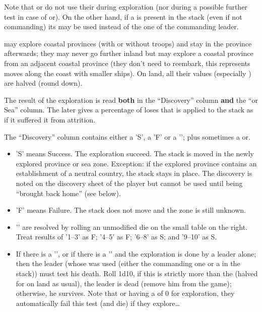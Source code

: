 \newcommand{\myxxa}{\phantom{a}\xxa\xspace}
\newcommand{\myxxc}{\phantom{a}\xxc\xspace}

Note that \LeaderG or \LeaderA do not use their \Man during exploration (nor
during a possible further test in case of\myxxa or\myxxc). On the
other hand, if a \LeaderMis is present in the stack (even if not commanding)
its \Man may be used instead of the one of the commanding leader.

\LeaderE may explore coastal provinces (with or without troops) and stay in
the province afterwards; they may never go further inland but may explore a
coastal province from an adjacent coastal province (they don't need to
reembark, this represents moves along the coast with smaller ships). On land,
all their values (especially \Man) are halved (round down).

The result of the exploration is read \textbf{both} in the ``Discovery''
column \textbf{and} the ``\ROTW or Sea'' column. The later gives a percentage
of loses that is applied to the stack as if it suffered it from
attrition.

The ``Discovery'' column contains either a 'S', a 'F' or a '\undemi'; plus
sometimes a\myxxa or\myxxc.
\begin{itemize}
\item 'S' means Success. The exploration succeed. The stack is moved in the
  newly explored province or sea zone. Exception: if the explored province
  contains an establishment of a neutral country, the stack stays in
  place. The discovery is noted on the discovery sheet of the player but
  cannot be used until being ``brought back home'' (see below).
\item 'F' means Failure. The stack does not move and the zone is still
  unknown.
\item '\undemi' are resolved by rolling an unmodified die on the small table
  on the right. Treat results of '1--3' as F\xxa; '4--5' as F\xxc; '6--8'
  as S\xxa; and '9--10' as S\xxc.
\item If there is a '\xxa', or if there is a '\xxc' and the exploration is
  done by a leader alone; then the leader (whose \Man was used (either the
  commanding one or a \LeaderMis in the stack)) must test his death. Roll
  1d10, if this is strictly more than the \Man (halved for \LeaderE on land as
  usual), the leader is dead (remove him from the game); otherwise, he
  survives. Note that \LeaderA or \LeaderG having a \Man of 0 for exploration,
  they automatically fail this test (and die) if they explore\ldots
\end{itemize}

